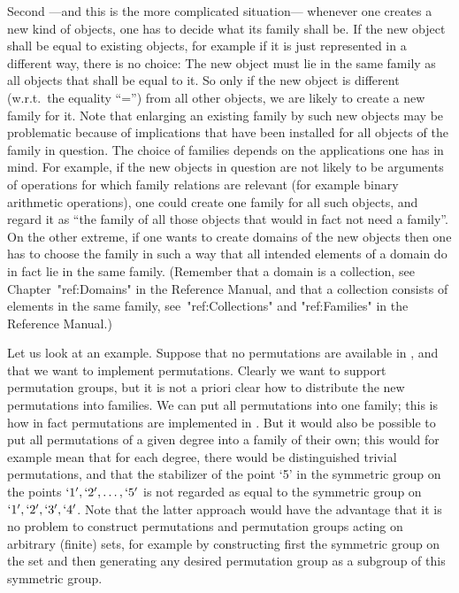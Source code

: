Second ---and this is the more complicated situation---
whenever one creates a new kind of objects,
one has to decide what its family shall be.
If the new object shall be equal to existing objects,
for example if it is just represented in a different way,
there is no choice:
The new object must lie in the same family as all objects
that shall be equal to it.
So only if the new object is different (w.r.t.~the equality ``='')
from all other {\GAP} objects, we are likely to create a new family
for it.
Note that enlarging an existing family by such new objects
may be problematic because of implications that have been
installed for all  objects of the family in question.
The choice of families depends on the applications one has in mind.
For example, if the new objects in question are not likely to be
arguments of operations for which family relations are relevant
(for example binary arithmetic operations),
one could create one family for all such objects,
and regard it as ``the family of all those {\GAP} objects that would
in fact not need a family''.
On the other extreme, if one wants to create domains of the new objects
then one has to choose the family in such a way that all intended
elements of a domain do in fact lie in the same family.
(Remember that a domain is a collection, see Chapter~"ref:Domains"
in the Reference Manual, and that a collection consists of elements
in the same family, see~"ref:Collections" and "ref:Families" in the
Reference Manual.)

Let us look at an example.
Suppose that no permutations are available in {\GAP},
and that we want to implement permutations.
Clearly we want to support permutation groups,
but it is not a priori clear how to distribute the new permutations
into families.
We can put all permutations into one family;
this is how in fact permutations are implemented in {\GAP}.
But it would also be possible to put all permutations of a given degree
into a family of their own;
this would for example mean that for each degree,
there would be distinguished trivial permutations,
and that the stabilizer of the point `5' in the symmetric group on the
points $`1', `2', \ldots, `5'$ is not regarded as equal to the
symmetric group on $`1', `2', `3', `4'$.
Note that the latter approach would have the advantage that it is
no problem to construct permutations and permutation groups acting on
arbitrary (finite) sets,
for example by constructing first the symmetric group on the set
and then generating any desired permutation group as a subgroup of this
symmetric group.

